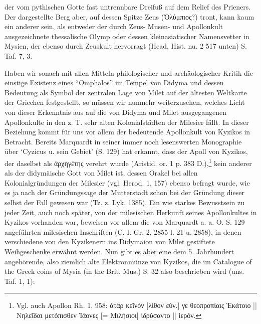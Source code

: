 \documentclass[a4paper, 11pt, oneside]{article}
\begin{document}
der vom pythischen Gotte fast untrennbare Dreifuß auf dem Relief des Prieners. Der dargestellte Berg aber, auf dessen Spitze Zeus (Ὀλύμπιος?) tront, kann kaum ein anderer sein, als entweder der durch Zeus- Musen- und Apollonkult ausgezeichnete thessalische Olymp oder dessen kleinasiatischer Namensvetter in Mysien, der ebenso durch Zeuskult hervorragt (Head, Hist. nu. 2 517 unten) S. Taf. 7, 3.

Haben wir sonach mit allen Mitteln philologischer und archäologischer Kritik die einstige Existenz eines "`Omphalos"' im Tempel von Didyma und dessen Bedeutung als Symbol der zentralen Lage von Milet auf der ältesten Weltkarte der Griechen festgestellt, so müssen wir nunmehr weiterzusehen, welches Licht von dieser Erkenntnis aus auf die von Didyma und Milet ausgegangenen Apollonkulte in den z. T. sehr alten Kolonialstädten der Milesier fällt. In dieser Beziehung kommt für uns vor allem der bedeutende Apollonkult von Kyzikos in Betracht. Bereits Marquardt in seiner immer noch lesenswerten Monographie über `Cyzicus u. sein Gebiet' (S. 129) hat erkannt, dass der Apoll von Kyzikos, der daselbst als ἀρχηγέτης verehrt wurde (Aristid. or. 1 p. 383 D.),\footnote{Vgl. auch Apollon Rh. 1, 958: ἀτὰρ κεῖνόν [λίθον εὐν.] γε θεοπροπίαις Ἑκάτοιο || Νηλεῖδαι μετόπισθεν Ἰάονες [= Μιλήσιοι] ἱδρύσαντο || ἱερόν.} kein anderer als der didymäische Gott von Milet ist, dessen Orakel bei allen Kolonialgründungen der Milesier (vgl. Herod. 1, 157) ebenso befragt wurde, wie es ja nach der Gründungssage der Mutterstadt schon bei der Gründung dieser selbst der Fall gewesen war (Tz. z. Lyk. 1385). Ein wie starkes Bewusstsein zu jeder Zeit, auch noch später, von der milesischen Herkunft seines Apollonkultes in Kyzikos vorhanden war, beweisen vor allem die von Marquardt a. a. O. S. 129 angeführten milesischen Inschriften (C. I. Gr. 2, 2855 l. 21 u. 2858), in denen verschiedene von den Kyzikenern ins Didymaion von Milet gestiftete Weihgeschenke erwähnt werden. Nun gibt es aber eine dem 5. Jahrhundert angehörende, also ziemlich alte Elektronmünze von Kyzikos, die im Catalogue of the Greek coins of Mysia (in the Brit. Mus.) S. 32 also beschrieben wird (uns. Taf. 1, 1):
\end{document}

